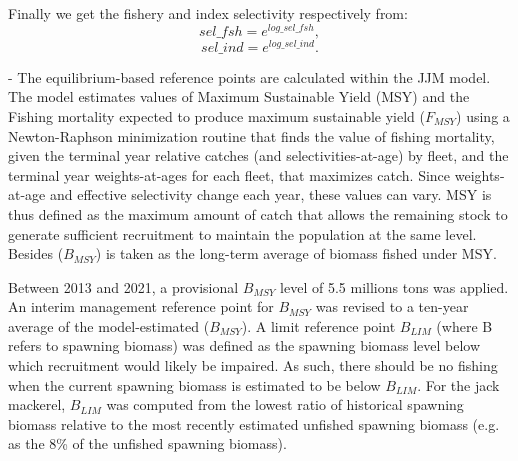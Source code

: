 \documentclass{article}
\begin{document}
Finally we get the fishery and index selectivity respectively from:
\begin{equation}
    sel\_fsh=e^{log\_sel\_fsh},
\end{equation}
\begin{equation}
    sel\_ind=e^{log\_sel\_ind}.
\end{equation}

- The equilibrium-based reference points are calculated within the JJM model. The model estimates values of Maximum Sustainable Yield (MSY) and the Fishing mortality expected to produce maximum sustainable yield (\(F_{MSY}\)) using a Newton-Raphson minimization routine that finds the value of fishing mortality, given the terminal year relative catches (and selectivities-at-age) by fleet,  and the terminal year weights-at-ages for each fleet, that maximizes catch. Since weights-at-age and effective selectivity change each year, these values can vary. MSY is thus defined as the maximum amount of catch that allows the remaining stock to generate sufficient recruitment to maintain the population at the same level. Besides (\(B_{MSY}\)) is taken as the long-term average of biomass fished under MSY.

Between 2013 and 2021, a provisional \(B_{MSY}\) level of 5.5 millions tons was applied. 
An interim management reference point for \(B_{MSY}\) was revised to a ten-year average of the model-estimated (\(B_{MSY}\)). 
A limit reference point \(B_{LIM}\) (where B refers to spawning biomass) was defined as the spawning biomass level below which recruitment would likely be impaired. As such, there should be no fishing when the current spawning biomass is estimated to be below \(B_{LIM}\).
For the jack mackerel, \(B_{LIM}\) was computed from the lowest ratio of historical spawning biomass relative to the most recently estimated unfished spawning biomass (e.g. as the 8\% of the unfished spawning biomass).\\

\end{document}

